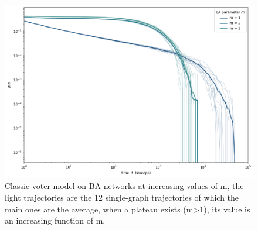 \begin{appendices}
\begin{figure}[htbp]
\end{figure}
\begin{figure}[htbp]
  \centering
  \includegraphics[width=14cm,keepaspectratio]{images/BA_classic.png}
  \caption{Classic voter model on BA networks at increasing values of m, the light trajectories are the 12 single-graph trajectories of which the main ones are the average, when a plateau exists (m>1), its value is an increasing function of m.}
  
\end{figure}
\clearpage






\end{appendices}
